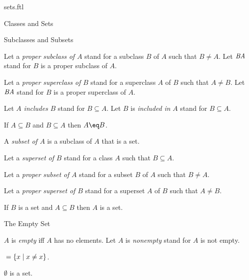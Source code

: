 \documentclass{naproche-library}
\begin{document}
\begin{smodule}{sets.ftl}
\begin{sfragment}{Classes and Sets}
\begin{sfragment}{Subclasses and Subsets}
\begin{definition*}[forthel,id=SubclassDef]
      Let a \emph{proper subclass of $A$} stand for a subclass $B$ of $A$ such that $B\neq A$.
      Let $\emph{B\subsetneq A}$ stand for $B$ is a proper subclass of $A$.

      Let a \emph{proper superclass of $B$} stand for a superclass $A$ of $B$ such that $A \neq B$.
      Let $\emph{B\supsetneq A}$ stand for $B$ is a proper superclass of $A$.

      Let \emph{$A$ includes $B$} stand for $B\subseteq A$.
      Let $B$ is \emph{included in $A$} stand for $B\subseteq A$.
    \end{definition*}

    \begin{axiom*}[forthel,title=Class Extensionality Axiom,id=ClassExtensionalityAx]
      If $A\subseteq B$ and $B\subseteq A$ then $A\eq B$.
    \end{axiom*}

    \begin{definition*}[forthel,id=SubsetDef]
      A \emph{subset of $A$} is a subclass of $A$ that is a set.

      Let a \emph{superset of $B$} stand for a class $A$ such that $B\subseteq A$.

      Let a \emph{proper subset of $A$} stand for a subset $B$ of $A$ such that $B\neq A$.

      Let a \emph{proper superset of $B$} stand for a superset $A$ of $B$ such that $A \neq B$.
    \end{definition*}

    \begin{axiom*}[forthel,title=Separation Axiom,id=SeparationAx]
      If $B$ is a set and $A\subseteq B$ then $A$ is a set.
    \end{axiom*}
  \end{sfragment}

  \begin{sfragment}{The Empty Set}
    \begin{definition*}[forthel,id=EmptyDef]
      $A$ is \emph{empty} iff $A$ has no elements.
      Let $A$ is \emph{nonempty} stand for $A$ is not empty.
    \end{definition*}

    \begin{definition*}[forthel,id=EmptySetDef]
      $\emph{\emptyset}=\{x\mid x\neq x\}$.
    \end{definition*}

    \begin{axiom*}[forthel,title=Empty Set Axiom,id=EmptySetAx]
      $\emptyset$ is a set.
    \end{axiom*}
  \end{sfragment}


\end{sfragment}
\end{smodule}
\end{document}
